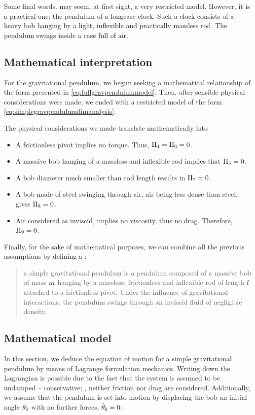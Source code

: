 Some final words.  may seem, at first sight, a very restricted model. However, it is a practical one: the pendulum of a longcase clock. Such a clock consists of a heavy bob hanging by a light, inflexible and practically massless rod. The pendulum swings inside a case full of air.


\subsection{Mathematical interpretation}\label{subsec:mathinterpretation}
For the gravitational pendulum, we begun seeking a mathematical relationship of the form presented in \cref{eq:fullgravpendulummodel}. Then, after sensible physical considerations were made, we ended with a restricted model of the form \cref{eq:simplegravpendulumdimanalysis}. 

The physical considerations we made translate mathematically into
\begin{itemize}
%
\item A frictionless pivot implies no torque. Thus, $\Pi_4 = \Pi_6 = 0$.
%
\item A massive bob hanging of a massless and inflexible rod implies that $\Pi_5 = 0$.
%
\item A bob diameter much smaller than rod length results in $\Pi_7 = 0$.
%
\item A bob made of steel swinging through air, air being less dense than steel, gives $\Pi_8 = 0$.
%
\item Air considered as inviscid, implies no viscosity, thus no drag. Therefore, $\Pi_9 = 0$.
%
\end{itemize}

Finally, for the sake of mathematical purposes, we can combine all the previous assumptions by defining a :
\begin{quote}
a simple gravitational pendulum is a pendulum composed of a massive bob of mass $m$ hanging by a massless, frictionless and inflexible rod of length $l$ attached to a frictionless pivot. Under the influence of gravitational interactions, the pendulum swings through an inviscid fluid of negligible density.
\end{quote}


\subsection{Mathematical model}\label{subsec:mathmodel}
In this section, we deduce the equation of motion for a simple gravitational pendulum by means of Lagrange formulation mechanics. Writing down the Lagrangian is possible due to the fact that the system is assumed to be undamped -- conservative; \ie, neither friction nor drag are considered. Additionally, we assume that the pendulum is set into motion by displacing the bob an initial angle $\theta_0$ with no further forces, $\dot{\theta}_0 = 0$.

